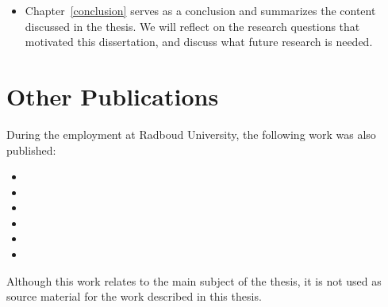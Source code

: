 \begin{itemize}
	{
		\scriptsize
		\begin{itemize}
			\item {}
		\end{itemize}
	}
	
	\item Chapter~\ref{conclusion} serves as a conclusion and summarizes the content discussed in the thesis. We will reflect on the research questions that motivated this dissertation, and discuss what future research is needed.
\end{itemize}

\section{Other Publications}
During the employment at Radboud University, the following work was also published: 

{\scriptsize
	\begin{itemize}	
		\item {}
		\item {}	
		\item {}
		\item {}
		\item {}
		\item {}
	\end{itemize}
}

Although this work relates to the main subject of the thesis, it is not used as source material for the work described in this thesis. 